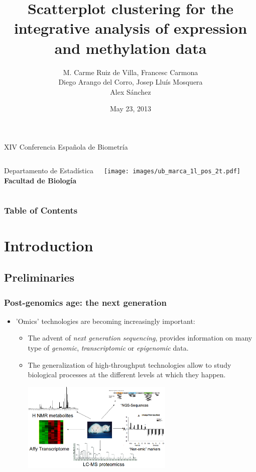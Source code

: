 \documentclass[handout]{beamer}
\title[Scatterplot clustering]{Scatterplot clustering for the integrative analysis of expression and methylation data}
\author[Ruiz de Villa]{M. Carme Ruiz de Villa, Francesc Carmona \\ Diego Arango del Corro, Josep Lluís Mosquera 
\\ Alex Sánchez}
\date[2013-05-23]{May 23, 2013}
\begin{document}
\begin{frame}
\begin{scriptsize}
\begin{center}
   XIV Conferencia Española de Biometría
\end{center}
\end{scriptsize}

\titlepage

\begin{columns}
   \scriptsize
   Departamento de Estadística \\ \textbf{Facultad de Biología}
    
   \hfill{}
   \texttt{[image: images/ub\_marca\_1l\_pos\_2t.pdf]}
\end{columns}
\end{frame}


\begin{frame}
\frametitle{Table of Contents}
\tableofcontents
\end{frame}

\section{Introduction}

\subsection{Preliminaries}

\begin{frame}
\frametitle{Post-genomics age: the next generation}
\begin{itemize}
\item 'Omics' technologies are becoming increasingly important:
\begin{itemize}
\item The advent of \emph{next generation sequencing}, provides information on many type of \emph{genomic}, \emph{transcriptomic} or \emph{epigenomic} data.
\item The generalization of  high-throughput technologies allow to study biological processes at the different levels at which they happen.
\begin{center}
\includegraphics[width=0.6\textwidth]{./images/multipleOmics.png}
\end{center}
\end{itemize} 
\end{itemize}
\end{frame}
\end{document}

